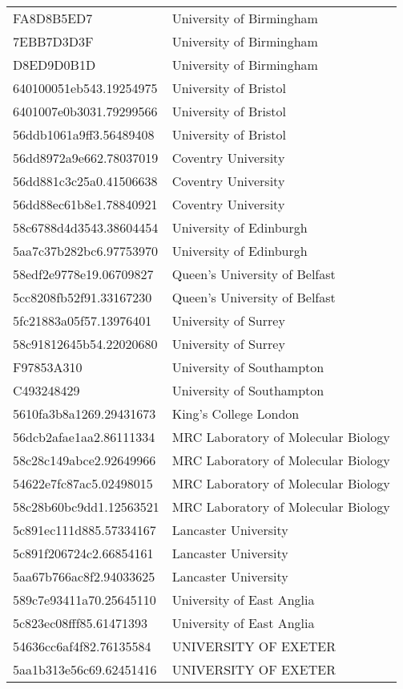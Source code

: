 \begin{tabular}{ll}
FA8D8B5ED7 & University of Birmingham \\
7EBB7D3D3F & University of Birmingham \\
D8ED9D0B1D & University of Birmingham \\
640100051eb543.19254975 & University of Bristol \\
6401007e0b3031.79299566 & University of Bristol \\
56ddb1061a9ff3.56489408 & University of Bristol \\
56dd8972a9e662.78037019 & Coventry University \\
56dd881c3c25a0.41506638 & Coventry University \\
56dd88ec61b8e1.78840921 & Coventry University \\
58c6788d4d3543.38604454 & University of Edinburgh \\
5aa7c37b282bc6.97753970 & University of Edinburgh \\
58edf2e9778e19.06709827 & Queen's University of Belfast \\
5cc8208fb52f91.33167230 & Queen's University of Belfast \\
5fc21883a05f57.13976401 & University of Surrey \\
58c91812645b54.22020680 & University of Surrey \\
F97853A310 & University of Southampton \\
C493248429 & University of Southampton \\
5610fa3b8a1269.29431673 & King's College London \\
56dcb2afae1aa2.86111334 & MRC Laboratory of Molecular Biology \\
58c28c149abce2.92649966 & MRC Laboratory of Molecular Biology \\
54622e7fc87ac5.02498015 & MRC Laboratory of Molecular Biology \\
58c28b60bc9dd1.12563521 & MRC Laboratory of Molecular Biology \\
5c891ec111d885.57334167 & Lancaster University \\
5c891f206724c2.66854161 & Lancaster University \\
5aa67b766ac8f2.94033625 & Lancaster University \\
589c7e93411a70.25645110 & University of East Anglia \\
5c823ec08fff85.61471393 & University of East Anglia \\
54636cc6af4f82.76135584 & UNIVERSITY OF EXETER \\
5aa1b313e56c69.62451416 & UNIVERSITY OF EXETER \\

\end{tabular}

